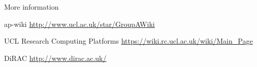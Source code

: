 \documentclass{beamer}
\begin{document}
\begin{frame}{More information}
  \begin{block}{ap-wiki}
    \url{http://www.ucl.ac.uk/star/GroupAWiki}
  \end{block}

  \begin{block}{UCL Research Computing Platforms}
    \url{https://wiki.rc.ucl.ac.uk/wiki/Main_Page}
  \end{block}

  \begin{block}{DiRAC}
    \url{http://www.dirac.ac.uk/}
  \end{block}
\end{frame}
\end{document}
